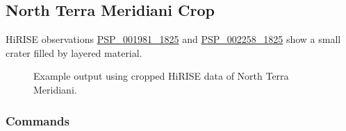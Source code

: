 \subsection{North Terra Meridiani Crop}

\ac{HiRISE} observations
\href{http://hirise.lpl.arizona.edu/PSP_001981_1825}{PSP\_001981\_1825} and
\href{http://hirise.lpl.arizona.edu/PSP_002258_1825}{PSP\_002258\_1825}
show a small crater filled by layered material.

\begin{figure}[h!]
\centering
  \hfil
\caption{Example output using cropped HiRISE data of North Terra Meridiani.}
\label{fig:hirise_nterra_example}
\end{figure}

\subsubsection*{Commands}

